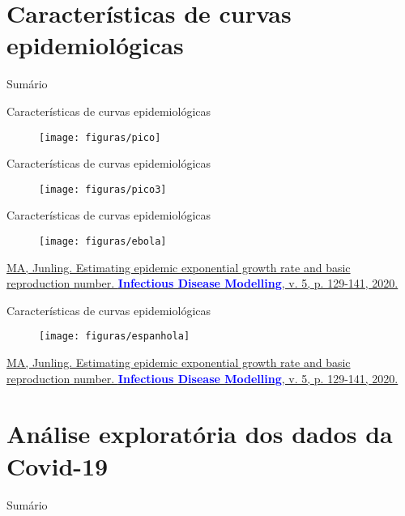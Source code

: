 \documentclass[xcolor=table,t]{beamer}
\begin{document}
\section{Características de curvas epidemiológicas}
\begin{frame}{Sumário}
\tableofcontents[currentsection]
\end{frame}

\begin{frame}[c]{Características de curvas epidemiológicas}
\begin{figure}
	\centering
	\texttt{[image: figuras/pico]}
\end{figure}
\end{frame}

\begin{frame}[c]{Características de curvas epidemiológicas}
\begin{figure}
	\centering
	\texttt{[image: figuras/pico3]}
\end{figure}
\end{frame}

\begin{frame}[c]{Características de curvas epidemiológicas}
\vspace{-0.5 cm}
\begin{figure}
	\centering
	\texttt{[image: figuras/ebola]}
\end{figure}
\justifying
\footnotesize
\href{https://doi.org/10.1016/j.idm.2019.12.009}{MA, Junling. Estimating epidemic exponential growth rate and basic reproduction number. \textbf{\textcolor{blue}{Infectious Disease Modelling}}, v. 5, p. 129-141, 2020.}
\end{frame}

\begin{frame}[c]{Características de curvas epidemiológicas}
\vspace{-0.5 cm}
\begin{figure}
	\centering
	\texttt{[image: figuras/espanhola]}
\end{figure}
\justifying
\footnotesize
\href{https://doi.org/10.1016/j.idm.2019.12.009}{MA, Junling. Estimating epidemic exponential growth rate and basic reproduction number. \textbf{\textcolor{blue}{Infectious Disease Modelling}}, v. 5, p. 129-141, 2020.}
\end{frame}

\section{Análise exploratória dos dados da Covid-19}
\begin{frame}{Sumário}
\tableofcontents[currentsection]
\end{frame}
\end{document}
